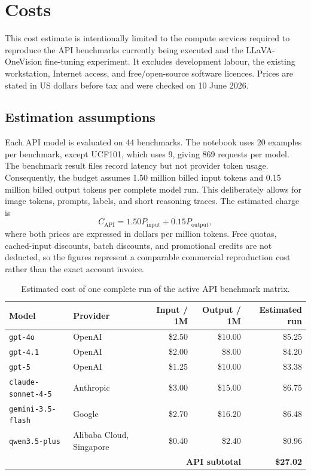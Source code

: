 ﻿\documentclass[11pt,a4paper]{article}
\begin{document}
\section{Costs}

This cost estimate is intentionally limited to the compute services required
to reproduce the API benchmarks currently being executed and the
LLaVA-OneVision fine-tuning experiment. It excludes development labour,
the existing workstation, Internet access, and free/open-source software
licences. Prices are stated in US dollars before tax and were checked on
10 June 2026.

\subsection{Estimation assumptions}

Each API model is evaluated on 44 benchmarks. The notebook uses 20 examples
per benchmark, except UCF101, which uses 9, giving 869 requests per model.
The benchmark result files record latency but not provider token usage.
Consequently, the budget assumes 1.50 million billed input tokens and
0.15 million billed output tokens per complete model run. This deliberately
allows for image tokens, prompts, labels, and short reasoning traces. The
estimated charge is
\[
 C_{\mathrm{API}} =
 1.50P_{\mathrm{input}} + 0.15P_{\mathrm{output}},
\]
where both prices are expressed in dollars per million tokens. Free quotas,
cached-input discounts, batch discounts, and promotional credits are not
deducted, so the figures represent a comparable commercial reproduction
cost rather than the exact account invoice.

\begin{table}[H]
\centering
\small
\caption{Estimated cost of one complete run of the active API benchmark
matrix.}
\label{tab:api-model-costs}
\begin{tabularx}{\textwidth}{@{}Xlrrr@{}}
\toprule
\textbf{Model} & \textbf{Provider} &
\textbf{Input / 1M} & \textbf{Output / 1M} &
\textbf{Estimated run} \\
\midrule
\texttt{gpt-4o} & OpenAI & \$2.50 & \$10.00 & \$5.25 \\
\texttt{gpt-4.1} & OpenAI & \$2.00 & \$8.00 & \$4.20 \\
\texttt{gpt-5} & OpenAI & \$1.25 & \$10.00 & \$3.38 \\
\texttt{claude-sonnet-4-5} & Anthropic & \$3.00 & \$15.00 & \$6.75 \\
\texttt{gemini-3.5-flash} & Google & \$2.70 & \$16.20 & \$6.48 \\
\texttt{qwen3.5-plus} & Alibaba Cloud, Singapore & \$0.40 & \$2.40 & \$0.96 \\
\midrule
\multicolumn{4}{r}{\textbf{API subtotal}} & \textbf{\$27.02} \\
\bottomrule
\end{tabularx}
\end{table}
\end{document}
